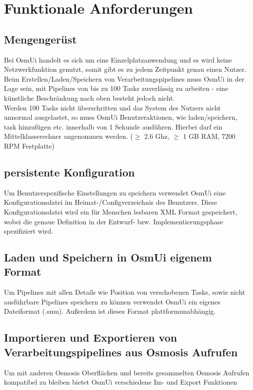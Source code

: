 \documentclass[a4paper,12pt]{scrartcl}
\begin{document}
\section{Funktionale Anforderungen}
\subsection{Mengengerüst}
Bei OsmUi handelt es sich um eine Einzelplatzanwendung und es wird keine Netzwerkfunktion genutzt, somit gibt es zu jedem Zeitpunkt genau einen Nutzer.\\
Beim Erstellen/Laden/Speichern von Verarbeitungspipelines muss OsmUi in der Lage sein, mit Pipelines von bis zu 100 Tasks zuverlässig zu arbeiten -
eine künstliche Beschränkung nach oben besteht jedoch nicht.\\
Werden 100 Tasks nicht überschritten und das System des Nutzers nicht unnormal ausgelastet, so muss OsmUi Benutzeraktionen, wie laden/speichern, task hinzufügen etc.
innerhalb von 1 Sekunde ausführen. Hierbei darf ein Mittelklasserechner angenommen werden. ($\geq$ 2.6 Ghz, $\geq$ 1 GB RAM, 7200 RPM Festplatte)
\subsection{persistente Konfiguration}
Um Benutzerspezifische Einstellungen zu speichern verwendet OsmUi eine Konfigurationsdatei im Heimat-/Configverzeichnis des Benutzers.
Diese Konfigurationsdatei wird ein für Menschen lesbaren XML Format gespeichert, wobei die genaue Definition in der Entwurf- bzw. Implementierungsphase
spezifiziert wird. 
\subsection{Laden und Speichern in OsmUi eigenem Format}
Um Pipelines mit allen Details wie Position von verschobenen Tasks, sowie nicht ausführbare Pipelines speichern zu können verwendet OsmUi ein eigenes Dateiformat
(.smu). Außerdem ist dieses Format plattformunabhängig.
\subsection{Importieren und Exportieren von Verarbeitungspipelines aus Osmosis Aufrufen}
Um mit anderen Osmosis Oberflächen und bereits gesammelten Osmosis Aufrufen kompatibel zu bleiben bietet OsmUi verschiedene Im- und Export Funktionen
\end{document}
